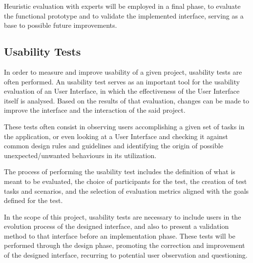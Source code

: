 Heuristic evaluation with experts will be employed in a final phase, to evaluate the functional prototype and to validate the implemented interface, serving as a base to possible future improvements.

\subsection{Usability Tests}

In order to measure and improve usability of a given project, usability tests are often performed. An usability test serves as an important tool for the usability evaluation of an User Interface, in which the effectiveness of the User Interface itself is analysed. Based on the results of that evaluation, changes can be made to improve the interface and the interaction of the said project.

These tests often consist in observing users accomplishing a given set of tasks in the application, or even looking at a User Interface and checking it against common design rules and guidelines \cite{kn:Joh14} and identifying the origin of possible unexpected/unwanted behaviours in its utilization.

The process of performing the usability test includes the definition of what is meant to be evaluated, the choice of participants for the test, the creation of test tasks and scenarios, and the selection of evaluation metrics aligned with the goals defined for the test.

In the scope of this project, usability tests are necessary to include users in the evolution process of the designed interface, and also to present a validation method to that interface before an implementation phase. These tests will be performed through the design phase, promoting the correction and improvement of the designed interface, recurring to potential user observation and questioning.



